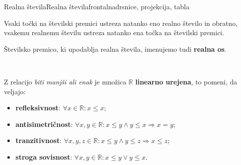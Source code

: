 \begin{priprava}{1}{}{Realna števila}{Realna števila}{frontalna}{drsnice, projekcija, tabla}
\begin{figure}[H]
                    
                \end{figure}
            

            
            
                Vsaki točki na številski premici ustreza natanko eno realno število in obratno, 
                vsakemu realnemu številu ustreza natanko ena točka na številski premici.
            

            
                Številsko premico, ki upodablja realna števila, imenujemo tudi \textbf{realna os}.
            


        
                ~~        
            
                Z relacijo \textit{biti manjši ali enak} je množica $\mathbb{R}$ \textbf{linearno urejena}, 
                to pomeni, da veljajo:

                \begin{itemize}
                    \item \textbf{refleksivnost}: $\forall x\in\mathbb{R}: x\leq x$;
                    \item \textbf{antisimetričnost}: $\forall x,y\in\mathbb{R}: x\leq y \land y\leq x \Rightarrow x=y$;
                    \item \textbf{tranzitivnost}: $\forall x,y,z\in\mathbb{R}: x\leq y \land y\leq z \Rightarrow x\leq z$;
                    \item \textbf{stroga sovisnost}: $\forall x,y\in\mathbb{R}: x\leq y \lor y\leq x$.
                \end{itemize}
            

\end{priprava}
